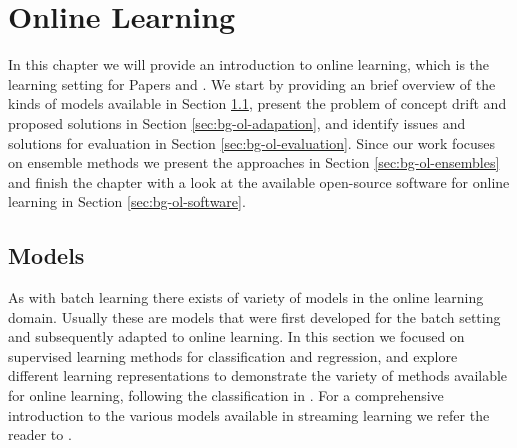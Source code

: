 \chapter{Online Learning}
\label{ch:bg-online-learning}

In this chapter we will provide an introduction to online learning, which is the learning
setting for Papers \boostvhtNum and \uncertaintreesNum. We start by providing an brief
overview of the kinds of models available in Section \ref{sec:bg-ol-models}, present
the problem of concept drift and proposed solutions in Section \ref{sec:bg-ol-adapation},
and identify issues and solutions for evaluation in Section \ref{sec:bg-ol-evaluation}.
Since our work focuses on ensemble methods we present the approaches in Section
\ref{sec:bg-ol-ensembles} and finish the chapter with a look at the available
open-source software for online learning in Section \ref{sec:bg-ol-software}.

\section{Models}
\label{sec:bg-ol-models}

As with batch learning there exists of variety of models in the online
learning domain. Usually these are models that were first developed
for the batch setting and subsequently adapted to online learning.
In this section we focused on supervised learning methods for
classification and regression, and explore different
learning representations to demonstrate the variety of
methods available for online learning, following the
classification in \cite{onlineML}. For a comprehensive
introduction to the various models available in streaming
learning we refer the reader to \cite{moa-book}.

